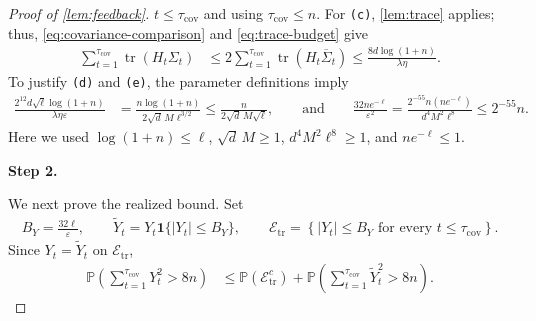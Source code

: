 \documentclass[11pt]{article}
\newcommand{\proofstepinline}[1]{%
    {\sffamily\bfseries\color{blue!55!black}Step #1.}\enspace
}
\newcommand{\reason}[1]{\texttt{(#1)}}
\newcommand{\Pp}{\mathbb P}
\newcommand{\tr}{\operatorname{tr}}
\newcommand{\1}{\mathbf 1}
\newcommand{\eps}{\varepsilon}
\begin{document}
\begin{proof}[Proof of \cref{lem:feedback}]
    $t\leq\tau_{\mathrm{cov}}$ and using $\tau_{\mathrm{cov}}\leq n$.
    For \reason{c}, \cref{lem:trace} applies; thus,
    \eqref{eq:covariance-comparison} and \eqref{eq:trace-budget} give
    \begin{align}
        \sum_{t=1}^{\tau_{\mathrm{cov}}}
        \tr(H_t\Sigma_t)
         & \leq
        2\sum_{t=1}^{\tau_{\mathrm{cov}}}
        \tr(H_t\overline\Sigma_t)
        \leq
        \frac{8d\log(1+n)}{\lambda\eta}.
        \label{eq:feedback-trace}
    \end{align}
    To justify \reason{d} and \reason{e}, the parameter definitions imply
    \begin{align}
        \frac{2^{12}d\sqrt\ell\log(1+n)}
        {\lambda\eta\eps}
         & =
        \frac{n\log(1+n)}
        {2\sqrt d\,M\ell^{3/2}}
        \leq
        \frac{n}{2\sqrt d\,M\sqrt\ell},
        \qquad\text{and}\qquad
        \frac{32ne^{-\ell}}{\eps^2}
        =
        \frac{2^{-55}n(ne^{-\ell})}
        {d^4M^2\ell^8}
        \leq2^{-55}n.
    \end{align}
    Here we used $\log(1+n)\leq\ell$, $\sqrt d\,M\geq1$,
    $d^4M^2\ell^8\geq1$, and $ne^{-\ell}\leq1$.

    \proofstepinline{2}
    We next prove the realized bound.  Set
    \begin{align}
        B_Y=\frac{32\ell}{\eps},
        \qquad
        \widetilde Y_t
        =
        Y_t\1\{|Y_t|\leq B_Y\},
        \qquad
        \mathcal E_{\mathrm{tr}}
        =
        \left\{
        |Y_t|\leq B_Y
        \text{ for every }t\leq\tau_{\mathrm{cov}}
        \right\}.
    \end{align}
    Since $Y_t=\widetilde Y_t$ on $\mathcal E_{\mathrm{tr}}$,
    \begin{align}
        \Pp\left(
        \sum_{t=1}^{\tau_{\mathrm{cov}}}Y_t^2
        >8n
        \right)
         & \leq
        \Pp(\mathcal E_{\mathrm{tr}}^c)
        +
        \Pp\left(
        \sum_{t=1}^{\tau_{\mathrm{cov}}}
        \widetilde Y_t^2
        >8n
        \right).
        \label{eq:feedback-realised-start}
    \end{align}


\end{proof}
\end{document}
